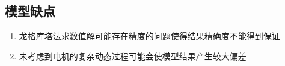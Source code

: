 \documentclass[12pt,a4paper]{nmmcm}
\begin{document}
\subsection{模型缺点}
\begin{enumerate}
\item 龙格库塔法求数值解可能存在精度的问题使得结果精确度不能得到保证
\item 未考虑到电机的复杂动态过程可能会使模型结果产生较大偏差
\end{enumerate}















\end{document}
